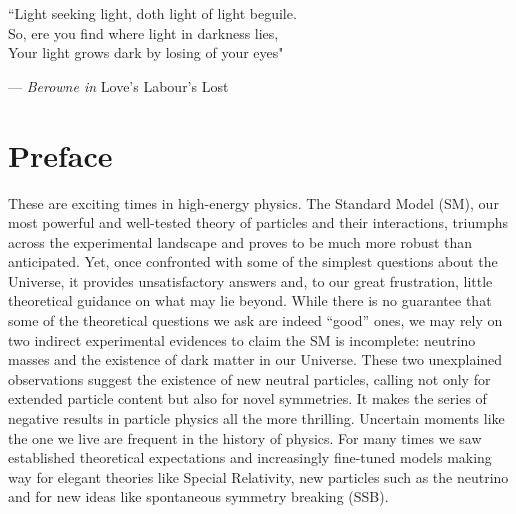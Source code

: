\documentclass[openany,twoside,frontopenright,chaprunninghead]{ip3thesis}
\begin{document}
\begin{epigraph*}
% 
% 


``Light seeking light, doth light of light beguile. \\So, ere you find where light in darkness lies, \\ Your light grows dark by losing of your eyes"

\flushright --- \emph{Berowne in} Love's Labour's Lost
\end{epigraph*} 

\chapter*{Preface}

These are exciting times in high-energy physics. The Standard Model (SM), our most powerful and well-tested theory of particles and their interactions, triumphs across the experimental landscape and proves to be much more robust than anticipated. Yet, once confronted with some of the simplest questions about the Universe, it provides unsatisfactory answers and, to our great frustration, little theoretical guidance on what may lie beyond. While there is no guarantee that some of the theoretical questions we ask are indeed ``good'' ones, we may rely on two indirect experimental evidences to claim the SM is incomplete: neutrino masses and the existence of dark matter in our Universe. These two unexplained observations suggest the existence of new neutral particles, calling not only for extended particle content but also for novel symmetries. It makes the series of negative results in particle physics all the more thrilling. Uncertain moments like the one we live are frequent in the history of physics. For many times we saw established theoretical expectations and increasingly fine-tuned models making way for elegant theories like Special Relativity, new particles such as the neutrino and for new ideas like spontaneous symmetry breaking (SSB).
\end{document}
